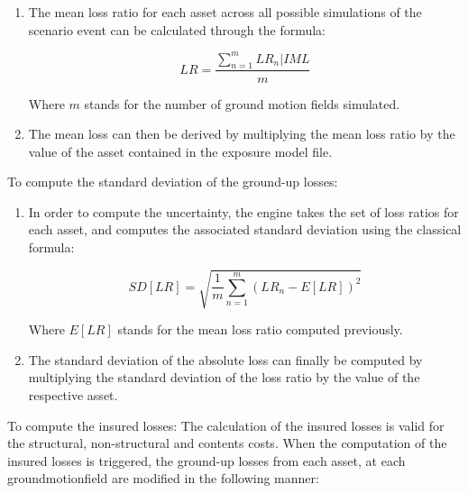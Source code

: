\begin{enumerate}
\begin{itemize}
\item Uncorrelated: the term $\epsilon$ is always randomly sampled for each \gls{asset} and therefore the correlation between the vulnerability of the \glspl{asset} is ignored.

\end{itemize}

\item The mean loss ratio for each \gls{asset} across all possible simulations of the scenario event can be calculated through the formula:

\begin{equation}
LR=\frac{\sum^m_{n=1}LR_n|IML}{m}
\end{equation}

Where $m$ stands for the number of ground motion fields simulated.

\item The mean loss can then be derived by multiplying the mean loss ratio by the value of the \gls{asset} contained in the \gls{exposure model} file.

\end{enumerate}

To compute the standard deviation of the ground-up losses:

\begin{enumerate}

\item In order to compute the uncertainty, the engine takes the set of loss ratios for each \gls{asset}, and computes the associated standard deviation using the classical formula:

\begin{equation}
SD[LR]=\sqrt{  \frac{1}{m}\sum_{n=1}^m{(LR_n-E[LR])^2} }
\end{equation}

Where $E[LR]$ stands for the mean loss ratio computed previously.

\item The standard deviation of the absolute loss can finally be computed by multiplying the standard deviation of the loss ratio by the value of the respective \gls{asset}.

\end{enumerate}

To compute the insured losses:
The calculation of the insured losses is valid for the structural, non-structural and contents costs. When the computation of the insured losses is triggered, the ground-up losses from each asset, at each \gls{groundmotionfield} are modified in the following manner:

